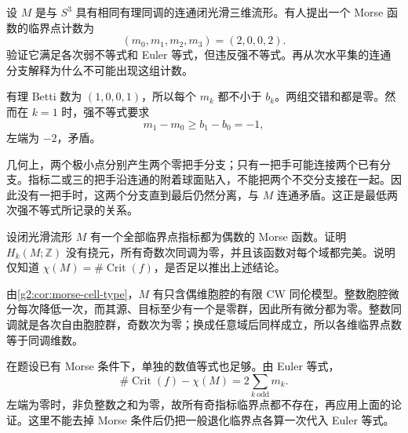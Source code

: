 \begin{exercise}\label{g2:ex:morse-weak-not-strong}
	设 \(M\) 是与 \(S^3\) 具有相同有理同调的连通闭光滑三维流形。有人提出一个 Morse 函数的临界点计数为
	\[
		(m_0,m_1,m_2,m_3)=(2,0,0,2).
	\]
	验证它满足各次弱不等式和 Euler 等式，但违反强不等式。再从次水平集的连通分支解释为什么不可能出现这组计数。
\end{exercise}
\begin{solution}
	有理 Betti 数为 \((1,0,0,1)\)，所以每个 \(m_k\) 都不小于 \(b_k\)。两组交错和都是零。然而在 \(k=1\) 时，强不等式要求
	\[
		m_1-m_0\ge b_1-b_0=-1,
	\]
	左端为 \(-2\)，矛盾。

	几何上，两个极小点分别产生两个零把手分支；只有一把手可能连接两个已有分支。指标二或三的把手沿连通的附着球面贴入，不能把两个不交分支接在一起。因此没有一把手时，这两个分支直到最后仍然分离，与 \(M\) 连通矛盾。这正是最低两次强不等式所记录的关系。
\end{solution}

\begin{exercise}\label{g2:ex:morse-even-indices}
	设闭光滑流形 \(M\) 有一个全部临界点指标都为偶数的 Morse 函数。证明 \(H_k(M;\mathbb Z)\) 没有挠元，所有奇数次同调为零，并且该函数对每个域都完美。说明仅知道 \(\chi(M)=\#\operatorname{Crit}(f)\)，是否足以推出上述结论。
\end{exercise}
\begin{solution}
	由\cref{g2:cor:morse-cell-type}，\(M\) 有只含偶维胞腔的有限 CW 同伦模型。整数胞腔微分每次降低一次，而其源、目标至少有一个是零群，因此所有微分都为零。整数同调就是各次自由胞腔群，奇数次为零；换成任意域后同样成立，所以各维临界点数等于同调维数。

	在题设已有 Morse 条件下，单独的数值等式也足够。由 Euler 等式，
	\[
		\#\operatorname{Crit}(f)-\chi(M)=2\sum_{k\ \mathrm{odd}}m_k.
	\]
	左端为零时，非负整数之和为零，故所有奇指标临界点都不存在，再应用上面的论证。这里不能去掉 Morse 条件后仍把一般退化临界点各算一次代入 Euler 等式。
\end{solution}

